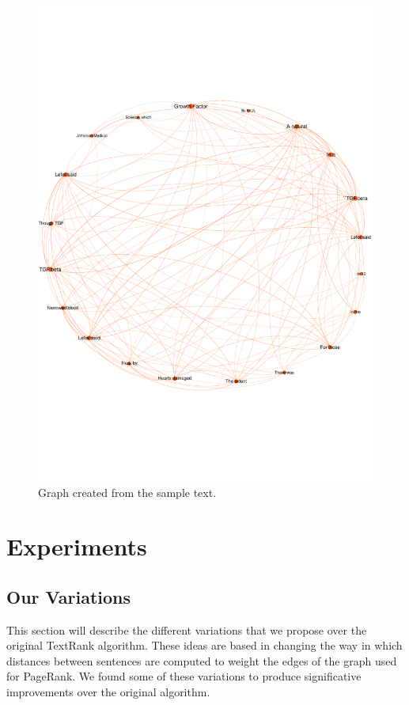 \documentclass{llncs}
\begin{document}
\begin{figure}[h!]
    \centering
    \includegraphics[trim = 0mm 50mm 0mm 50mm, clip, scale=0.15,width=1\textwidth]{graph.pdf}
    \caption{Graph created from the sample text.}
    \label{fig:graph}
\end{figure}


\section{Experiments}

\subsection{Our Variations}
This section will describe the different variations that we propose over the original TextRank algorithm. These ideas are based in changing the way in which distances between sentences are computed to weight the edges of the graph used for PageRank. We found some of these variations to produce significative improvements over the original algorithm.
\end{document}
